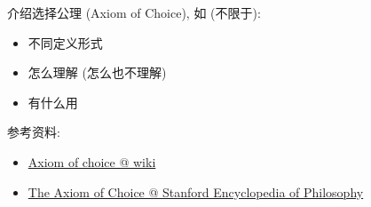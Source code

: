 \documentclass[a4paper, justified]{tufte-handout}
\begin{document}
\vspace{0.50cm}
\begin{ot}[选择公理]
	介绍选择公理 (Axiom of Choice), 如 (不限于):
	\begin{itemize}
		\item 不同定义形式
		\item 怎么理解 (怎么也不理解)
		\item 有什么用
	\end{itemize}

	\noindent 参考资料:
	\begin{itemize}
		\item \href{https://en.wikipedia.org/wiki/Axiom\_of\_choice}{Axiom of choice @ wiki}
		\item \href{https://plato.stanford.edu/entries/axiom-choice/}{The Axiom of Choice @ Stanford Encyclopedia of Philosophy}
	\end{itemize}
\end{ot}




\begincorrection


\beginfb

\end{document}
